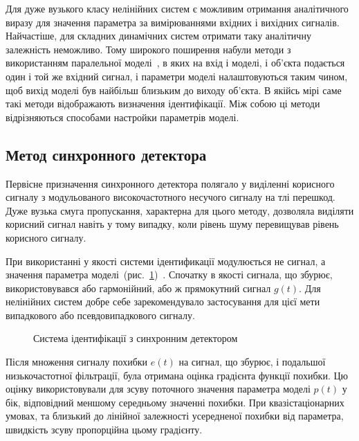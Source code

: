 Для дуже вузького класу нелінійних систем є можливим отримання
аналітичного виразу для значення параметра за вимірюваннями
вхідних і вихідних сигналів. Найчастіше, для складних динамічних
систем отримати таку аналітичну залежність неможливо. Тому
широкого поширення набули методи з використанням паралельної
моделі~\cite{lung_id_sys, gropp_methods_id, deith_method_id_ds}, в яких на вхід і моделі,
і об'єкта подається один і той же вхідний сигнал, і параметри
моделі налаштовуються таким чином, щоб вихід моделі був
найбільш близьким до виходу об'єкта. В якійсь мірі саме такі
методи відображають визначення ідентифікації. Між собою ці
методи відрізняються способами настройки параметрів моделі.


\subsection{Метод синхронного детектора} %

Первісне призначення синхронного детектора полягало у
виділенні корисного сигналу з модульованого високочастотного
несучого сигналу на тлі перешкод.
Дуже вузька смуга пропускання, характерна для цього методу,
дозволяла виділяти корисний сигнал навіть у тому випадку, коли
рівень шуму перевищував рівень корисного сигналу.

При використанні у якості системи ідентификації
модулюється не сигнал, а значення параметра моделі~(рис.~\ref{atu:f:syncdet})~\cite{eykhoff_id_base}.
Спочатку в якості сигнала, що збурює,
використовувався або гармонійний, або ж прямокутний сигнал $g(t)$.
Для нелінійних систем добре себе зарекомендувало застосування
для цієї мети випадкового або псевдовипадкового  сигналу.

\begin{figure}[htb!]
\begin{center}

\end{center}
\caption{Система ідентифікації з синхронним детектором}
\label{atu:f:syncdet}
\end{figure}

Після множення сигналу похибки
$ e (t) $ на сигнал, що збурює,
і подальшої низькочастотної фільтрації,
була отримана оцінка градієнта функції похибки.
Цю оцінку використовували для
зсуву поточного значення параметра моделі $p(t)$
у бік, відповідний меншому середньому значенні похибки.
При квазістаціонарних умовах, та близький до лінійної залежності
усередненої похибки від параметра, швидкість
зсуву пропорційна цьому градієнту.


